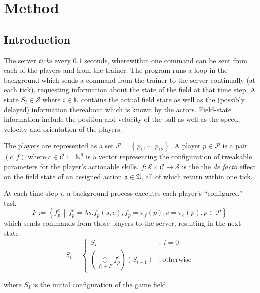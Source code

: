 \documentclass[10pt,a4paper]{article}
\begin{document}
\section{Method}

\subsection{Introduction}
The server \textit{ticks} every \(0.1\) seconds, wherewithin one command can be sent from each of the players and from the trainer. The program runs a loop in the background which sends a command from the trainer to the server continually (at each tick), requesting information about the state of the field at that time step. A state \(S_i \in \mathcal{S}\) where \(i \in \mathbb{N}\) contains the actual field state as well as the (possibly delayed) information thereabout which is known by the actors. Field-state information include the position and velocity of the ball as well as the speed, velocity and orientation of the players.

The players are represented as a set \(\mathcal{P}=\left\{p_1,\cdots,p_{12}\right\}\). A player \(p \in \mathcal{P}\) is a pair \((c, f)\) where \(c \in \mathcal{C} := \mathbb{N}^6\) is a vector representing the configuration of tweakable parameters for the player's actionable skills. \(f : \mathcal{S}\times \mathcal{C} \to \mathcal{S}\) is the the \textit{de facto} effect on the field state of an assigned action \(\mathfrak{a}\in\mathfrak{A}\), all of which return within one tick.

At each time step \(i\), a background process executes each player's ``configured'' task
\[
		F := \left\{ f_p^c \,\middle|\, f_p^c = \lambda s.f_p(s, c), f_p = \pi_f(p), c = \pi_c(p), p \in\mathcal{P} \right\}
\]
which sends commands from those players to the server, resulting in the next state 
\[
		S_{i} = \left\{
			\begin{array}{cl}
				S_I & : \ i = 0 \\
					\left(\underset{f_p^c\in F}\bigcirc f_p^c\right)(S_{i-1}) & : \ \text{otherwise}
			\end{array}
		\right. %
\]

where \(S_I\) is the initial configuration of the game field.
\end{document}
